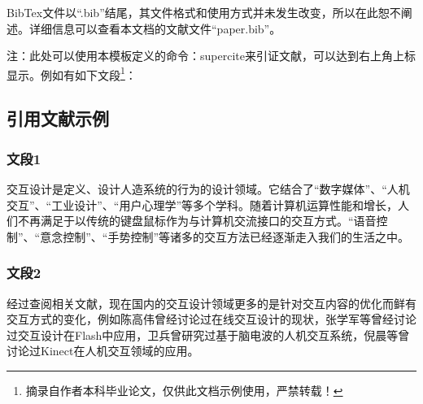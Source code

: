         BibTex文件以“.bib”结尾，其文件格式和使用方式并未发生改变，所以在此恕不阐述。详细信息可以查看本文档的文献文件“paper.bib”。

        注：此处可以使用本模板定义的命令：\tbs supercite{}来引证文献，可以达到右上角上标显示。例如有如下文段\footnote{摘录自作者本科毕业论文，仅供此文档示例使用，严禁转载！}：

        \subsection{引用文献示例}
            \subsubsection{文段1}
                交互设计是定义、设计人造系统的行为的设计领域\supercite{book_interaction_design}。它结合了“数字媒体”、“人机交互”、“工业设计”、“用户心理学”等多个学科。随着计算机运算性能和增长，人们不再满足于以传统的键盘鼠标作为与计算机交流接口的交互方式。“语音控制”、“意念控制”、“手势控制”等诸多的交互方法已经逐渐走入我们的生活之中。

            \subsubsection{文段2}
                经过查阅相关文献，现在国内的交互设计领域更多的是针对交互内容的优化而鲜有交互方式的变化，例如陈高伟曾经讨论过在线交互设计的现状\supercite{article_current_situation_and_trend_of_design_of_online_interaction}，张学军等曾经讨论过交互设计在Flash中应用\supercite{article_flash_interaction_design}，卫兵曾研究过基于脑电波的人机交互系统\supercite{thesis_design_and_research_of_a_hci_control_system_based_on_eeg_alpha_reythm}，倪晨等曾讨论过Kinect在人机交互领域的应用\supercite{article_the_research_and_application_of_kinect_technology_in_the_field_of_human_computer_interaction}。



        
